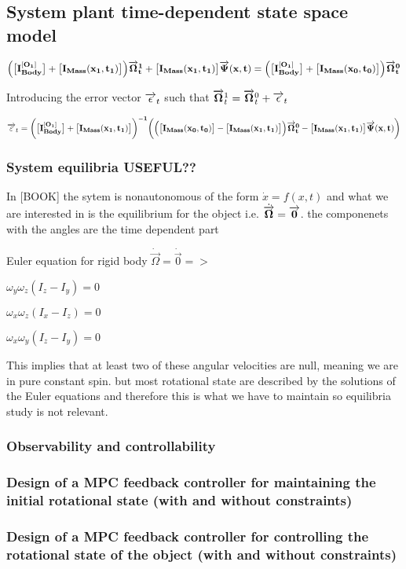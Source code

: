 \subsection{System plant time-dependent state space model}
$ \Big(\big[\bf I^{[O_1]}_{Body}\big] +\big [I_{Mass}(x_1,t_1)\big]\Big) \overrightarrow{\bf \Omega}^{1}_{t}+\big [I_{Mass}(x_1,t_1)\big] \overrightarrow{\bf \Psi}(x,t)= \Big(\big[\bf I^{[O_1]}_{Body}\big] +\big [I_{Mass}(x_0,t_0)\big]\Big)\overrightarrow{\bf \Omega}^{0}_{t}$

Introducing the error vector $\overrightarrow{\bf \epsilon}_{t}$ such that $\overrightarrow{\bf \Omega}^{1}_{t}=\overrightarrow{\bf \Omega}^{0}_{t}+\overrightarrow{\bf \epsilon}_{t}$

$\overrightarrow{\bf \varepsilon}_{t}=\bigg(\big[\bf I^{[O_1]}_{Body}\big] +\big [I_{Mass}(x_1,t_1)\big]\bigg)^{-1}\bigg(\Big(\big [I_{Mass}(x_0,t_0)\big]-\big [I_{Mass}(x_1,t_1)\big] \Big) \overrightarrow{\bf \Omega}^{0}_{t} -\big [I_{Mass}(x_1,t_1)\big] \overrightarrow{\bf \Psi}(x,t)\bigg)$

\subsubsection{System equilibria USEFUL??}
\label{System equilibrian}

In [BOOK] the sytem is nonautonomous of the form $\dot x =f(x,t)$ and what we are interested in is the equilibrium for the object i.e. $\dot{ \overrightarrow{\bf \Omega}}=\overrightarrow{\bf 0}$. the componenets with the angles are the time dependent part

Euler equation for rigid body $\dot{ \overrightarrow{\Omega}}=\dot {\overrightarrow{0}} =>$

$\omega_{y}\omega_{z}(I_{z}-I_{y})=0$

$\omega_{x}\omega_{z}(I_{x}-I_{z})=0$

$\omega_{x}\omega_{y}(I_{z}-I_{y})=0$

This implies that at least two of these angular velocities are null, meaning we are in pure constant spin. but most rotational state are described by the solutions of the Euler equations and therefore this is what we have to maintain so equilibria study is not relevant.
\subsubsection{Observability and controllability}
\subsubsection{Design of a MPC feedback controller for maintaining the initial rotational state (with  and without constraints)}
\subsubsection{Design of a MPC feedback controller for controlling the rotational state of the object (with  and without constraints)}




